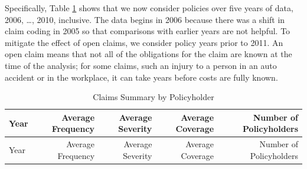 \documentclass[]{book}
\theoremstyle{definition}
\theoremstyle{definition}
\theoremstyle{definition}
\theoremstyle{remark}
\begin{document}
Specifically, Table \ref{tab:CoverageBCIM} shows that we now consider
policies over five years of data, 2006, \ldots{}, 2010, inclusive. The
data begins in 2006 because there was a shift in claim coding in 2005 so
that comparisons with earlier years are not helpful. To mitigate the
effect of open claims, we consider policy years prior to 2011. An open
claim means that not all of the obligations for the claim are known at
the time of the analysis; for some claims, such an injury to a person in
an auto accident or in the workplace, it can take years before costs are
fully known.

\begin{longtable}[]{@{}lrrrr@{}}
\caption{\label{tab:CoverageBCIM} Claims Summary by
Policyholder}\tabularnewline
\toprule
\begin{minipage}[b]{0.17\columnwidth}\raggedright\strut
Year\strut
\end{minipage} & \begin{minipage}[b]{0.14\columnwidth}\raggedleft\strut
Average Frequency\strut
\end{minipage} & \begin{minipage}[b]{0.17\columnwidth}\raggedleft\strut
Average Severity\strut
\end{minipage} & \begin{minipage}[b]{0.16\columnwidth}\raggedleft\strut
Average Coverage\strut
\end{minipage} & \begin{minipage}[b]{0.16\columnwidth}\raggedleft\strut
Number of Policyholders\strut
\end{minipage}\tabularnewline
\midrule
\endfirsthead
\toprule
\begin{minipage}[b]{0.17\columnwidth}\raggedright\strut
Year\strut
\end{minipage} & \begin{minipage}[b]{0.14\columnwidth}\raggedleft\strut
Average Frequency\strut
\end{minipage} & \begin{minipage}[b]{0.17\columnwidth}\raggedleft\strut
Average Severity\strut
\end{minipage} & \begin{minipage}[b]{0.16\columnwidth}\raggedleft\strut
Average Coverage\strut
\end{minipage} & \begin{minipage}[b]{0.16\columnwidth}\raggedleft\strut
Number of Policyholders\strut
\end{minipage}\tabularnewline
\midrule
\endhead

\end{longtable}
\end{document}
